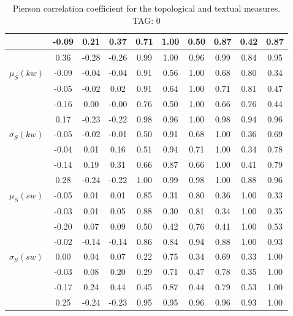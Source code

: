 \begin{table*}[h!]
\begin{center}
\begin{tabular}{| l | c | c | c | c | c | c | c | c | c |}
 & -0.09  & 0.21  & 0.37  & 0.71  & 1.00  & 0.50  & 0.87  & 0.42  & 0.87 \\\hline
 & 0.36  & -0.28  & -0.26  & 0.99  & 1.00  & 0.96  & 0.99  & 0.84  & 0.95 \\\hline
$\mu_S(kw)$ & -0.09  & -0.04  & -0.04  & 0.91  & 0.56  & 1.00  & 0.68  & 0.80  & 0.34 \\\hline
 & -0.05  & -0.02  & 0.02  & 0.91  & 0.64  & 1.00  & 0.71  & 0.81  & 0.47 \\\hline
 & -0.16  & 0.00  & -0.00  & 0.76  & 0.50  & 1.00  & 0.66  & 0.76  & 0.44 \\\hline
 & 0.17  & -0.23  & -0.22  & 0.98  & 0.96  & 1.00  & 0.98  & 0.94  & 0.96 \\\hline
$\sigma_S(kw)$ & -0.05  & -0.02  & -0.01  & 0.50  & 0.91  & 0.68  & 1.00  & 0.36  & 0.69 \\\hline
 & -0.04  & 0.01  & 0.16  & 0.51  & 0.94  & 0.71  & 1.00  & 0.34  & 0.78 \\\hline
 & -0.14  & 0.19  & 0.31  & 0.66  & 0.87  & 0.66  & 1.00  & 0.41  & 0.79 \\\hline
 & 0.28  & -0.24  & -0.22  & 1.00  & 0.99  & 0.98  & 1.00  & 0.88  & 0.96 \\\hline
$\mu_S(sw)$ & -0.05  & 0.01  & 0.01  & 0.85  & 0.31  & 0.80  & 0.36  & 1.00  & 0.33 \\\hline
 & -0.03  & 0.01  & 0.05  & 0.88  & 0.30  & 0.81  & 0.34  & 1.00  & 0.35 \\\hline
 & -0.20  & 0.07  & 0.09  & 0.50  & 0.42  & 0.76  & 0.41  & 1.00  & 0.53 \\\hline
 & -0.02  & -0.14  & -0.14  & 0.86  & 0.84  & 0.94  & 0.88  & 1.00  & 0.93 \\\hline
$\sigma_S(sw)$ & 0.00  & 0.04  & 0.07  & 0.22  & 0.75  & 0.34  & 0.69  & 0.33  & 1.00 \\\hline
 & -0.03  & 0.08  & 0.20  & 0.29  & 0.71  & 0.47  & 0.78  & 0.35  & 1.00 \\\hline
 & -0.17  & 0.24  & 0.44  & 0.45  & 0.87  & 0.44  & 0.79  & 0.53  & 1.00 \\\hline
 & 0.25  & -0.24  & -0.23  & 0.95  & 0.95  & 0.96  & 0.96  & 0.93  & 1.00 \\\hline
\end{tabular}
\caption{Pierson correlation coefficient for the topological and textual measures. TAG: 0}
\end{center}
\end{table*}